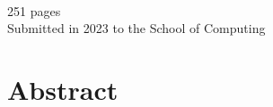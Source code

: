 \thispagestyle{empty}
\begin{center}
    \spacedlowsmallcaps{\myName} \\ \medskip

    \begingroup
        \color{CTtitle}\spacedallcaps{\myTitle}
    \endgroup

    \bigskip

    251 pages \\ \medskip
    Submitted in 2023 to the School of Computing
\end{center}

\section*{Abstract} 
